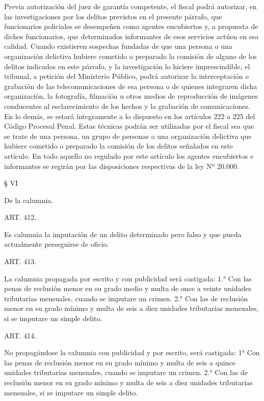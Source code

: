     Previa autorización del juez de garantía competente, el fiscal podrá autorizar, en las investigaciones por los delitos previstos en el presente párrafo, que funcionarios policiales se desempeñen como agentes encubiertos y, a propuesta de dichos funcionarios, que determinados informantes de esos servicios actúen en esa calidad.
    Cuando existieren sospechas fundadas de que una persona o una organización delictiva hubiere cometido o preparado la comisión de alguno de los delitos indicados en este párrafo, y la investigación lo hiciere imprescindible, el tribunal, a petición del Ministerio Público, podrá autorizar la interceptación o grabación de las telecomunicaciones de esa persona o de quienes integraren dicha organización, la fotografía, filmación u otros medios de reproducción de imágenes conducentes al esclarecimiento de los hechos y la grabación de comunicaciones. En lo demás, se estará íntegramente a lo dispuesto en los artículos 222 a 225 del Código Procesal Penal.
    Estas técnicas podrán ser utilizadas por el fiscal sea que se trate de una persona, un grupo de personas o una organización delictiva que hubiere cometido o preparado la comisión de los delitos señalados en este artículo.
    En todo aquello no regulado por este artículo los agentes encubiertos e informantes se regirán por las disposiciones respectivas de la ley Nº 20.000.
   
    § VI

    De la calumnia.


    ART. 412.

    Es calumnia la imputación de un delito determinado pero falso y que pueda actualmente perseguirse de oficio.

    ART. 413.

    La calumnia propagada por escrito y con publicidad será castigada:
    1.° Con las penas de reclusión menor en su grado medio y multa de once a veinte unidades tributarias mensuales, cuando se imputare
un crimen.
    2.° Con las de reclusión menor en su grado mínimo y multa de seis a diez unidades tributarias mensuales, si se imputare un simple delito.




    ART. 414.

    No propagándose la calumnia con publicidad y por escrito, será castigada:
    1° Con las penas de reclusión menor en su grado mínimo y multa de seis a quince unidades tributarias mensuales, cuando se imputare un crimen.
    2.° Con las de reclusión menor en su grado mínimo y multa de seis a diez unidades tributarias mensuales, si se imputare un simple delito.




